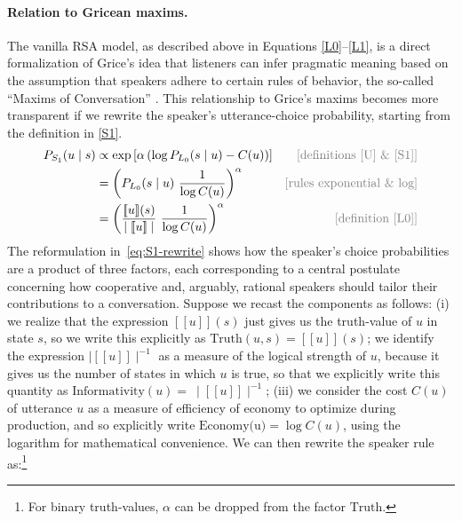 \documentclass{sp}
\newcommand{\sem}[1]{\ensuremath{[\![#1]\!]}}
\begin{document}
\paragraph{Relation to Gricean maxims.} The vanilla RSA model, as described above in Equations
\eqref{L0}--\eqref{L1}, is a direct formalization of Grice's idea that listeners can infer
pragmatic meaning based on the assumption that speakers adhere to certain rules of behavior,
the so-called ``Maxims of Conversation'' \citep{Grice1975:Logic-and-Conve}. This relationship to Grice's maxims becomes more
transparent if we rewrite the speaker's utterance-choice probability, starting from the
definition in \eqref{S1}.
%
\begin{align} \label{eq:S1-rewrite}
  P_{S_1}(u\mid s) & \propto \exp \left [ \alpha \left (\log P_{L_0}(s \mid u) - C(u) \right)  \right ] & \text{\textcolor{gray}{[definitions \eqref{U} \& \eqref{S1}]}} \\
  & = \left (P_{L_0}(s \mid u) \  \frac{1}{\log C(u)} \right)^{\alpha} & \text{\textcolor{gray}{[rules exponential \& log]}} \nonumber \\
  & = \left ( \frac{\sem{u}(s)}{\mid  \sem{u} \mid } \ \frac{1}{\log C(u)} \right )^{\alpha} & \text{\textcolor{gray}{[definition \eqref{L0}]}} \nonumber
\end{align}
%
The reformulation in~\eqref{eq:S1-rewrite} shows how the speaker's choice probabilities are a
product of three factors, each corresponding to a central postulate concerning how cooperative and, arguably, rational speakers should tailor their contributions
to a conversation. Suppose we recast the components as follows: (i) we realize that the expression $\sem{u}(s)$ just gives us the truth-value of $u$ in state $s$, so we write this explicitly as 
$\text{Truth}(u,s) = \sem{u}(s)$; we identify the expression $\mid \sem{u}\mid ^{-1}$ as a measure of the logical strength of $u$, because it gives us the number of states in which $u$ is true, so that we explicitly write this quantity as  $\text{Informativity}(u) =\ \mid \sem{u}\mid ^{-1}$; (iii) we consider the cost $C(u)$ of utterance $u$ as a measure of efficiency of economy to optimize during production, and so explicitly write $\text{Economy(u)} = \log C(u)$, using the logarithm for mathematical convenience. We can then rewrite the speaker rule as:\footnote{For
binary truth-values, $\alpha$ can be dropped from the factor $\text{Truth}$.}
\end{document}
